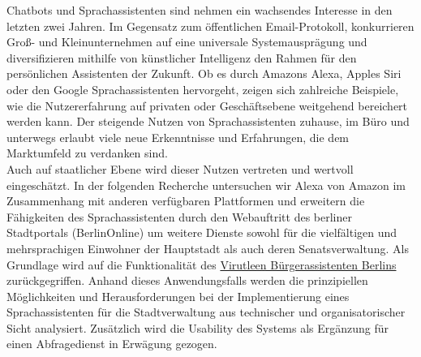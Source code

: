 Chatbots und Sprachassistenten sind nehmen ein wachsendes Interesse in den letzten zwei Jahren. %
Im Gegensatz zum öffentlichen Email-Protokoll, 
konkurrieren Groß- und Kleinunternehmen auf eine universale Systemausprägung und diversifizieren mithilfe von künstlicher Intelligenz den Rahmen für den persönlichen Assistenten der Zukunft.
Ob es durch Amazons Alexa, Apples Siri oder den Google Sprachassistenten hervorgeht, zeigen sich zahlreiche Beispiele, wie die Nutzererfahrung auf privaten oder Geschäftsebene weitgehend bereichert werden kann.
Der steigende Nutzen von Sprachassistenten zuhause, im Büro und unterwegs erlaubt viele neue Erkenntnisse und Erfahrungen, die dem Marktumfeld zu verdanken sind. \\


 
Auch auf staatlicher Ebene wird dieser Nutzen vertreten und wertvoll eingeschätzt. In der folgenden Recherche untersuchen wir Alexa von Amazon im Zusammenhang mit anderen verfügbaren Plattformen und erweitern die Fähigkeiten des Sprachassistenten durch den Webauftritt des berliner Stadtportals (BerlinOnline) um weitere Dienste sowohl für die vielfältigen und mehrsprachigen Einwohner der Hauptstadt als auch deren Senatsverwaltung. Als Grundlage wird auf die Funktionalität des  \href{{http://service.berlin.de}}{Virutleen Bürgerassistenten Berlins}
zurückgegriffen. Anhand dieses Anwendungsfalls werden die prinzipiellen Möglichkeiten und Herausforderungen bei der Implementierung eines Sprachassistenten für die Stadtverwaltung aus technischer und organisatorischer Sicht analysiert. Zusätzlich wird die Usability des Systems als Ergänzung für einen Abfragedienst in Erwägung gezogen. %


